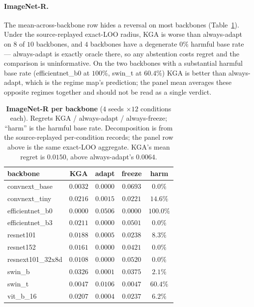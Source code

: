 \paragraph{ImageNet-R.} The mean-across-backbone row hides a reversal on most backbones
(Table~\ref{tab:imagenetr-backbone}). Under the source-replayed exact-LOO radius, \textsc{KGA} is
worse than always-adapt on $8$ of $10$ backbones, and $4$ backbones have a
degenerate $0\%$ harmful base rate --- always-adapt is exactly oracle there, so any abstention costs
regret and the comparison is uninformative. On the two backbones with a substantial harmful base rate
(efficientnet\_b0 at $100\%$, swin\_t at $60.4\%$) \textsc{KGA} is better than always-adapt, which is
the regime map's prediction; the panel mean averages these opposite regimes together and should not
be read as a single verdict.

\begin{table}[t]\centering\footnotesize
\caption{\textbf{ImageNet-R per backbone} ($4$ seeds $\times12$ conditions each). Regrets
KGA / always-adapt / always-freeze; ``harm'' is the harmful base rate. Decomposition is from the
source-replayed per-condition records; the panel row above is the same exact-LOO aggregate.
\textsc{KGA}'s mean regret is $0.0150$, above always-adapt's $0.0064$.}
\label{tab:imagenetr-backbone}
\begin{tabular}{lcccc}
\toprule
backbone & KGA & adapt & freeze & harm \\
\midrule
convnext\_base & $0.0032$ & $0.0000$ & $0.0693$ & $0.0\%$ \\
convnext\_tiny & $0.0216$ & $0.0015$ & $0.0221$ & $14.6\%$ \\
efficientnet\_b0 & $0.0000$ & $0.0506$ & $0.0000$ & $100.0\%$ \\
efficientnet\_b3 & $0.0211$ & $0.0000$ & $0.0501$ & $0.0\%$ \\
resnet101 & $0.0188$ & $0.0005$ & $0.0238$ & $8.3\%$ \\
resnet152 & $0.0161$ & $0.0000$ & $0.0421$ & $0.0\%$ \\
resnext101\_32x8d & $0.0108$ & $0.0000$ & $0.0520$ & $0.0\%$ \\
swin\_b & $0.0326$ & $0.0001$ & $0.0375$ & $2.1\%$ \\
swin\_t & $0.0047$ & $0.0106$ & $0.0047$ & $60.4\%$ \\
vit\_b\_16 & $0.0207$ & $0.0004$ & $0.0237$ & $6.2\%$ \\
\bottomrule
\end{tabular}
\end{table}

